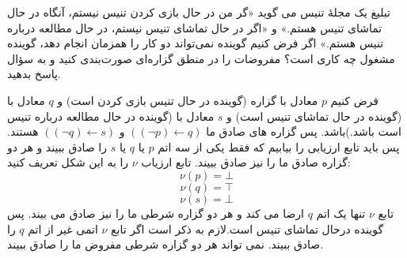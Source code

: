 تبلیغ یک مجلهٔ تنیس می گوید «گر من در حال بازی کردن تنیس نیستم، آنگاه در حال تماشای تنیس هستم.» و «اگر در حال تماشای تنیس نیستم، در حال مطالعه درباره تنیس هستم.» اگر فرض کنیم گوینده نمی‌تواند دو کار را همزمان انجام دهد، گوینده مشغول چه کاری است؟ مفروضات را در منطق گزاره‌ای صورت‌بندی کنید و به سؤال پاسخ بدهید.
\begin{ans}

	فرض کنیم 
    $p$
    معادل با گزاره (گوینده در حال تنیس بازی کردن است) و
    $q$
    معادل با (گوینده در حال تماشای تنیس است) و
    $s$
    معادل با (گوینده در حال مطالعه درباره تنیس است باشد.)باشد. پس گزاره های صادق ما 
    $((\neg p) \leftarrow q)$
    و 
    $((\neg q) \leftarrow s)$
    هستند. پس باید تابع ارزیابی را بیابیم که فقط یکی از سه اتم 
    $p$
    یا 
    $q$
    یا 
    $s$
    را صادق ببیند و هر دو گزاره صادق ما را نیز صادق ببیند. 
    تابع ارزیاب 
    $\nu$
    را به این شکل تعریف کنید:
    \[\nu(p) = \bot\]
    \[\nu(q) = \top\]
    \[\nu(s) = \bot\]
    تابع 
    $\nu$
    تنها یک اتم 
    $q$
    ارضا می کند و هر دو گزاره شرطی ما را نیز صادق می بیند. پس گوینده درحال تماشای تنیس است.لازم به ذکر است اگر تابع 
    $\nu$
    اتمی غیر از اتم
    $q$
    را صادق ببیند. نمی تواند هر دو گزاره شرطی مفروض ما را صادق ببیند.
    

\end{ans}
